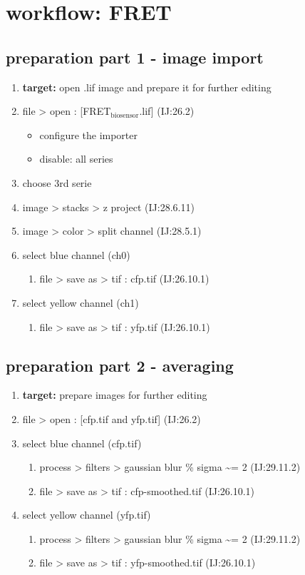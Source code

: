 \documentclass[11pt]{article}
\begin{document}
\section{workflow: FRET}
\label{sec-9}
\subsection{preparation part 1 - image import}
\label{sec-9-1}
\begin{enumerate}
\item \textbf{target:} open .lif image and prepare it for further editing
\item file > open : [FRET$_{\text{biosensor}}$.lif] (IJ:26.2)
\begin{itemize}
\item configure the importer
\item disable: all series
\end{itemize}
\item choose 3rd serie
\item image > stacks > z project (IJ:28.6.11)
\item image > color > split channel (IJ:28.5.1)
\item select blue channel (ch0) 
\begin{enumerate}
\item file > save as > tif : cfp.tif (IJ:26.10.1)
\end{enumerate}
\item select yellow channel (ch1) 
\begin{enumerate}
\item file > save as > tif : yfp.tif (IJ:26.10.1)
\end{enumerate}
\end{enumerate}

\subsection{preparation part 2 - averaging}
\label{sec-9-2}
\begin{enumerate}
\item \textbf{target:} prepare images for further editing
\item file > open : [cfp.tif and yfp.tif] (IJ:26.2)
\item select blue channel (cfp.tif)
\begin{enumerate}
\item process > filters > gaussian blur \% sigma \textasciitilde{}= 2 (IJ:29.11.2)
\item file > save as > tif : cfp-smoothed.tif (IJ:26.10.1)
\end{enumerate}
\item select yellow channel (yfp.tif)
\begin{enumerate}
\item process > filters > gaussian blur \% sigma \textasciitilde{}= 2 (IJ:29.11.2)
\item file > save as > tif : yfp-smoothed.tif (IJ:26.10.1)
\end{enumerate}
\end{enumerate}
\end{document}
